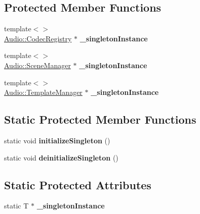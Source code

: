 \subsection*{Protected Member Functions}
\begin{DoxyCompactItemize}
\item 
{\footnotesize template$<$$>$ }\\\hyperlink{classAudio_1_1CodecRegistry}{Audio\+::\+Codec\+Registry} $\ast$ {\bfseries \+\_\+singleton\+Instance}\hypertarget{classSingleton_a5dc5b1d8e5c216952ab25aefb50bf793}{}\label{classSingleton_a5dc5b1d8e5c216952ab25aefb50bf793}

\item 
{\footnotesize template$<$$>$ }\\\hyperlink{classAudio_1_1SceneManager}{Audio\+::\+Scene\+Manager} $\ast$ {\bfseries \+\_\+singleton\+Instance}\hypertarget{classSingleton_ac3d0c1904e272f9a424fc0c73ee83517}{}\label{classSingleton_ac3d0c1904e272f9a424fc0c73ee83517}

\item 
{\footnotesize template$<$$>$ }\\\hyperlink{classAudio_1_1TemplateManager}{Audio\+::\+Template\+Manager} $\ast$ {\bfseries \+\_\+singleton\+Instance}\hypertarget{classSingleton_a440bda685dc1e6f43a7ade750305dc9a}{}\label{classSingleton_a440bda685dc1e6f43a7ade750305dc9a}

\end{DoxyCompactItemize}
\subsection*{Static Protected Member Functions}
\begin{DoxyCompactItemize}
\item 
static void {\bfseries initialize\+Singleton} ()\hypertarget{classSingleton_aaf75cd664ac7684dea01a55dd6272532}{}\label{classSingleton_aaf75cd664ac7684dea01a55dd6272532}

\item 
static void {\bfseries deinitialize\+Singleton} ()\hypertarget{classSingleton_a2543d676ee9fa76532b6c16831d6fb53}{}\label{classSingleton_a2543d676ee9fa76532b6c16831d6fb53}

\end{DoxyCompactItemize}
\subsection*{Static Protected Attributes}
\begin{DoxyCompactItemize}
\item 
static T $\ast$ {\bfseries \+\_\+singleton\+Instance}\hypertarget{classSingleton_afe92e0fde86132dbf841d9998a83debd}{}\label{classSingleton_afe92e0fde86132dbf841d9998a83debd}

\end{DoxyCompactItemize}


